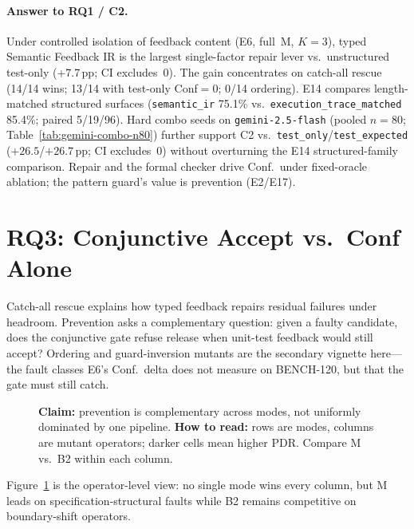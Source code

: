 \paragraph{Answer to RQ1 / C2.}
Under controlled isolation of feedback content (E6, full~M, $K{=}3$), typed
Semantic Feedback IR is the largest single-factor repair lever vs.\
unstructured test-only (+7.7\,pp; CI excludes~0).
The gain concentrates on catch-all rescue (14/14 wins; 13/14 with test-only
Conf${=}0$; 0/14 ordering).
E14 compares length-matched structured surfaces
(\texttt{semantic\_ir} 75.1\% vs.\
\texttt{execution\_trace\_matched} 85.4\%; paired 5/19/96).
Hard combo seeds on \texttt{gemini-2.5-flash} (pooled $n{=}80$;
Table~\ref{tab:gemini-combo-n80}) further support C2 vs.\
\texttt{test\_only}/\texttt{test\_expected} (${+}26.5$/${+}26.7$\,pp;
CI excludes~0) without overturning the E14 structured-family comparison.
Repair and the formal checker drive Conf.\ under fixed-oracle ablation; the
pattern guard's value is prevention (E2/E17).

\section{RQ3: Conjunctive Accept vs.\ Conf Alone}
\label{sec:results:rq3}

Catch-all rescue explains how typed feedback repairs residual failures under
headroom.
Prevention asks a complementary question: given a faulty candidate, does the
conjunctive gate refuse release when unit-test feedback would still accept?
Ordering and guard-inversion mutants are the secondary vignette here---the
fault classes E6's Conf.\ delta does not measure on BENCH-120, but that the
gate must still catch.

\begin{figure}[t]
  \centering
  \caption{\textbf{Claim:} prevention is complementary across modes, not
    uniformly dominated by one pipeline.
    \textbf{How to read:} rows are modes, columns are mutant operators; darker
    cells mean higher PDR.  Compare M vs.\ B2 within each column.}
  \label{fig:prevention-heatmap}
\end{figure}

Figure~\ref{fig:prevention-heatmap} is the operator-level view: no single mode
wins every column, but M leads on specification-structural faults while B2
remains competitive on boundary-shift operators.

